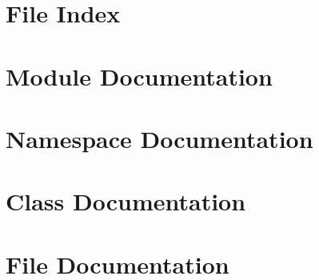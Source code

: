 \documentclass[twoside]{book}
\newcommand{\+}{\discretionary{\mbox{\scriptsize$\hookleftarrow$}}{}{}}
\newcommand{\clearemptydoublepage}{%
  \newpage{\pagestyle{empty}\cleardoublepage}%
}
\begin{document}
\chapter{File Index}

\chapter{Module Documentation}


\chapter{Namespace Documentation}














\chapter{Class Documentation}








\chapter{File Documentation}












































\newpage
{}



\backmatter
\newpage
{}
\clearemptydoublepage
{}
\printindex
\end{document}
